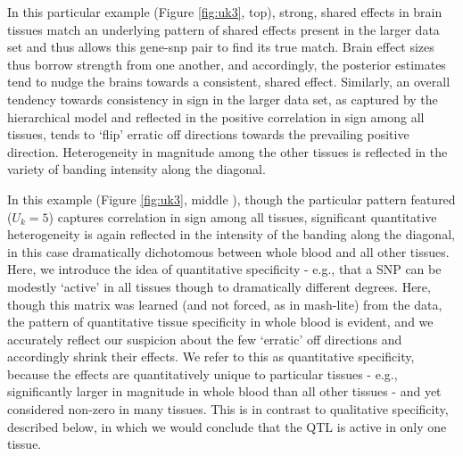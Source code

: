 In this particular example (Figure \ref{fig:uk3}, top), strong, shared effects in brain tissues match an underlying pattern of shared effects present in the larger data set and thus allows this gene-snp pair to find its true match. Brain effect sizes thus borrow strength from one another, and accordingly, the posterior estimates tend to nudge the brains towards a consistent, shared effect. Similarly, an overall tendency towards consistency in sign in the larger data set, as captured by the hierarchical model and reflected in the positive correlation in sign among all tissues, tends to `flip' erratic off directions towards the prevailing positive direction. Heterogeneity in magnitude among the other tissues is reflected in the variety of banding intensity along the diagonal.\newline

%


In this example (Figure \ref{fig:uk3}, middle ), though the particular pattern featured ($U_{k}=5$) captures correlation in sign among all tissues, significant quantitative heterogeneity is again reflected in the intensity of the banding along the diagonal, in this case dramatically dichotomous between whole blood and all other tissues. Here, we introduce the idea of quantitative specificity - e.g., that a SNP can be modestly `active' in all tissues though to dramatically different degrees. Here, though this matrix was learned (and not forced, as in mash-lite) from the data, the pattern of quantitative tissue specificity in %
whole blood is evident, and we accurately reflect our suspicion about the few `erratic' off directions and accordingly shrink their effects. %
We refer to this as quantitative specificity, because the effects are quantitatively unique to particular tissues - e.g., significantly larger in magnitude in whole blood than all other tissues - and yet considered non-zero in many tissues. This is in contrast to qualitative specificity, described below, in which we would conclude that the QTL is active in only one tissue. \newline




